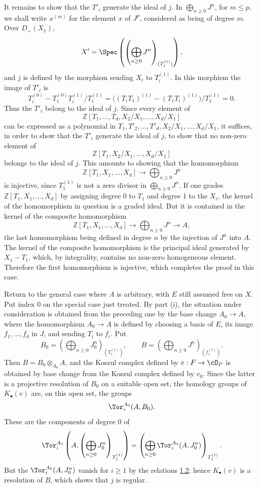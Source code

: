 It remains to show that the \(T'_i\) generate the ideal of \(j\). In \(\bigoplus_{n\ge0}J^n\), for \(m\le p\), we shall write \(x^{(m)}\) for the element \(x\) of \(J^p\), considered as being of degree \(m\). Over \(D_+(X_1)\),
\[
  X'=\Spec\left(\left(\bigoplus_{n\ge0}J^n\right)_{(T_1^{(1)})}\right),
\]
and \(j\) is defined by the morphism sending \(X_i\) to \(T_i^{(1)}\). In this morphism the image of \(T'_i\) is
\[
T_i^{(0)}-T_1^{(0)}T_i^{(1)}/T_1^{(1)}
=\bigl((T_iT_1)^{(1)}-(T_1T_i)^{(1)}\bigr)/T_1^{(1)}=0.
\]
Thus the \(T'_i\) belong to the ideal of \(j\). Since every element of
\[
\mathbb Z[T_1,\ldots,T_d,X_2/X_1,\ldots,X_d/X_1]
\]
can be expressed as a polynomial in \(T_1,T'_2,\ldots,T'_d,X_2/X_1,\ldots,X_d/X_1\), it suffices, in order to show that the \(T'_i\) generate the ideal of \(j\), to show that no non-zero element of
\[
\mathbb Z[T_1,X_2/X_1,\ldots,X_d/X_1]
\]
belongs to the ideal of \(j\). This amounts to showing that the homomorphism
\[
\mathbb Z[T_1,X_1,\ldots,X_d]\longrightarrow\bigoplus_{n\ge0}J^n
\]
is injective, since \(T_1^{(1)}\) is not a zero divisor in \(\bigoplus_{n\ge0}J^n\). If one grades \(\mathbb Z[T_1,X_1,\ldots,X_d]\) by assigning degree \(0\) to \(T_1\) and degree \(1\) to the \(X_i\), the kernel of the homomorphism in question is a graded ideal. But it is contained in the kernel of the composite homomorphism
\[
\mathbb Z[T_1,X_1,\ldots,X_d]\longrightarrow
\bigoplus_{n\ge0}J^n\longrightarrow A,
\]
the last homomorphism being defined in degree \(n\) by the injection of \(J^n\) into \(A\). The kernel of the composite homomorphism is the principal ideal generated by \(X_1-T_1\), which, by integrality, contains no non-zero homogeneous element. Therefore the first homomorphism is injective, which completes the proof in this case.

Return to the general case where \(A\) is arbitrary, with \(E\) still assumed free on \(X\). Put index \(0\) on the special case just treated. By part (i), the situation under consideration is obtained from the preceding one by the base change \(A_0\to A\), where the homomorphism \(A_0\to A\) is defined by choosing a basis of \(E\), its image \(f_1,\ldots,f_d\) in \(J\), and sending \(T_i\) to \(f_i\). Put
\[
  B_0=\left(\bigoplus_{n\ge0}J_0^n\right)_{(T_1^{(1)})},\qquad
  B=\left(\bigoplus_{n\ge0}J^n\right)_{(f_1^{(1)})}.
\]
Then \(B=B_0\otimes_{A_0}A\), and the Koszul complex defined by \(v:F\to\cO_P\) is obtained by base change from the Koszul complex defined by \(v_0\). Since the latter is a projective resolution of \(B_0\) on a suitable open set, the homology groups of \(K_\bullet(v)\) are, on this open set, the groups
\[
\Tor_i^{A_0}(A,B_0).
\]
These are the components of degree \(0\) of
\[
\Tor_i^{A_0}\left(A,\left(\bigoplus_{n\ge0}J_0^n\right)_{T_1^{(1)}}\right)
=\left(\bigoplus_{n\ge0}\Tor_i^{A_0}(A,J_0^n)\right)_{T_1^{(1)}}.
\]
But the \(\Tor_i^{A_0}(A,J_0^n)\) vanish for \(i\ge1\) by the relations \hyperlink{sga6.e07.lem.1-2}{1.2}; hence \(K_\bullet(v)\) is a resolution of \(B\), which shows that \(j\) is regular.

